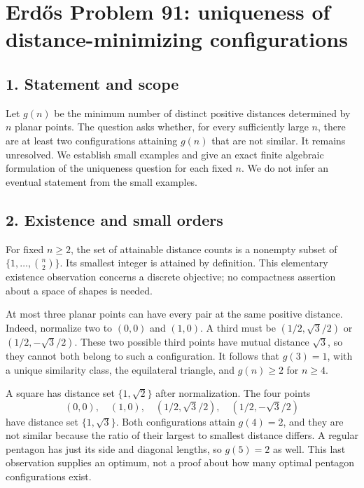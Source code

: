 \section*{Erd\H{o}s Problem 91: uniqueness of distance-minimizing configurations}

\subsection*{1. Statement and scope}
Let $g(n)$ be the minimum number of distinct positive distances determined by $n$ planar points. The question asks whether, for every sufficiently large $n$, there are at least two configurations attaining $g(n)$ that are not similar. It remains unresolved. We establish small examples and give an exact finite algebraic formulation of the uniqueness question for each fixed $n$. We do not infer an eventual statement from the small examples.

\subsection*{2. Existence and small orders}
For fixed $n\ge2$, the set of attainable distance counts is a nonempty subset of $\{1,\ldots,\binom n2\}$. Its smallest integer is attained by definition. This elementary existence observation concerns a discrete objective; no compactness assertion about a space of shapes is needed.

At most three planar points can have every pair at the same positive distance. Indeed, normalize two to $(0,0)$ and $(1,0)$. A third must be $(1/2,\sqrt3/2)$ or $(1/2,-\sqrt3/2)$. These two possible third points have mutual distance $\sqrt3$, so they cannot both belong to such a configuration. It follows that $g(3)=1$, with a unique similarity class, the equilateral triangle, and $g(n)\ge2$ for $n\ge4$.

A square has distance set $\{1,\sqrt2\}$ after normalization. The four points
\[
 (0,0),\quad(1,0),\quad(1/2,\sqrt3/2),\quad(1/2,-\sqrt3/2)
\]
have distance set $\{1,\sqrt3\}$. Both configurations attain $g(4)=2$, and they are not similar because the ratio of their largest to smallest distance differs. A regular pentagon has just its side and diagonal lengths, so $g(5)=2$ as well. This last observation supplies an optimum, not a proof about how many optimal pentagon configurations exist.


